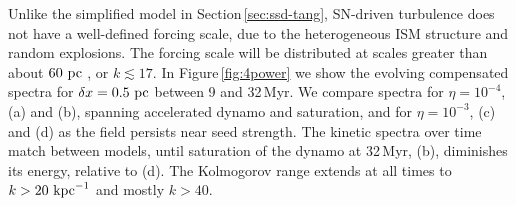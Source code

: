 \documentclass[preprint2]{aastex63}
\newcommand\kpc{~ {\rm kpc}}
\newcommand\pc{~ {\rm pc}}
\newcommand\dx{ {\delta x}}
\begin{document}
 Unlike the simplified model in Section\,\ref{sec:ssd-tang}, SN-driven
 turbulence does not have a well-defined forcing scale, due to the
 heterogeneous ISM structure and random explosions.
 The forcing scale will be distributed at scales greater than about $60\pc$
 \citep[][Table\,3]{HSSFG17}, or $k\lesssim17$.
 In Figure\,\ref{fig:4power} we show the evolving compensated spectra for 
 $\dx=0.5\pc$ between 9 and 32\,Myr.
 We compare spectra for $\eta=10^{-4}$, (a) and (b), spanning accelerated 
 dynamo and saturation, and for $\eta=10^{-3}$, (c) and (d) as the field
 persists near seed strength.
 The kinetic spectra over time match between models, until saturation
 of the dynamo at 32\,Myr, (b), diminishes its energy, relative to (d).
 The Kolmogorov range extends at all times to $k>20\kpc^{-1}$ and mostly 
 $k>40$. 
\end{document}

